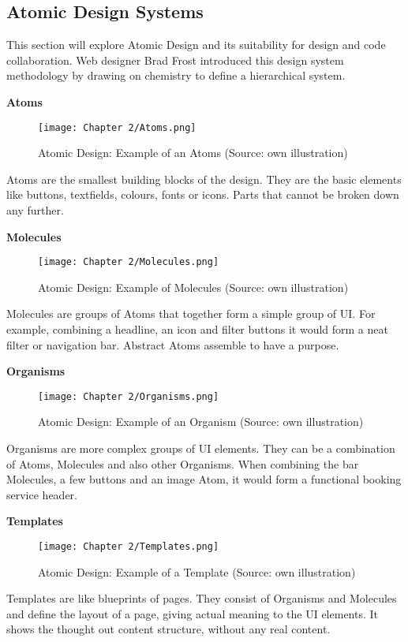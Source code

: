 \newpage
\subsection{Atomic Design Systems} \label{Atomic Design Systems}
This section will explore Atomic Design and its suitability for design and code collaboration. Web
designer Brad Frost introduced this design system methodology by drawing on chemistry to define a
hierarchical system.

\textbf{Atoms} \\
\begin{figure}[H]
	\centering
    \texttt{[image: Chapter 2/Atoms.png]}
    \caption{Atomic Design: Example of an Atoms (Source: own illustration)}
\end{figure}
Atoms are the smallest building blocks of the design. They are the basic elements like buttons,
textfields, colours, fonts or icons. Parts that cannot be broken down any further.

\textbf{Molecules} \\
\begin{figure}[H]
	\centering
    \texttt{[image: Chapter 2/Molecules.png]}
    \caption{Atomic Design: Example of Molecules (Source: own illustration)}
\end{figure}
Molecules are groups of Atoms that together form a simple group of UI. For example, combining
a headline, an icon and filter buttons it would form a neat filter or navigation bar. Abstract Atoms
assemble to have a purpose.  

\textbf{Organisms} \\
\begin{figure}[H]
	\centering
    \texttt{[image: Chapter 2/Organisms.png]}
    \caption{Atomic Design: Example of an Organism (Source: own illustration)}
\end{figure}
Organisms are more complex groups of UI elements. They can be a combination of Atoms, Molecules and
also other Organisms. When combining the bar Molecules, a few buttons and an image Atom, it would
form a functional booking service header. 

\textbf{Templates} \\
\begin{figure}[H]
	\centering
    \texttt{[image: Chapter 2/Templates.png]}
    \caption{Atomic Design: Example of a Template (Source: own illustration)}
\end{figure}
Templates are like blueprints of pages. They consist of Organisms and Molecules and define the
layout of a page, giving actual meaning to the UI elements. It shows the thought out content
structure, without any real content. 

